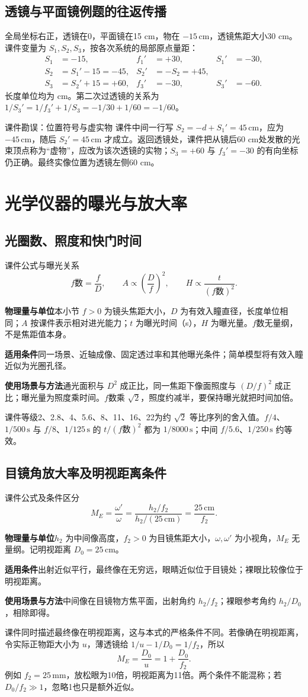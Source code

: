 \documentclass[UTF8,fontset=none,zihao=-4,a4paper]{ctexart}
\newcommand{\chapterpage}[1]{\clearpage\section{#1}}
\newcommand{\unit}[1]{\,\mathrm{#1}}
\newcommand{\explain}[3]{\par\noindent\textbf{物理量与单位}\quad #1\par
\noindent\textbf{适用条件}\quad #2\par
\noindent\textbf{使用场景与方法}\quad #3\par}
\begin{document}
\subsection{透镜与平面镜例题的往返传播}
全局坐标右正，透镜在0，平面镜在15 cm，物在 $-15\unit{cm}$，透镜焦距大小30 cm。课件变量为 $S_1,S_2,S_3$，按各次系统的局部原点量距：
\begin{align*}
 S_1&=-15, & f_1'&=+30, & S_1'&=-30,\\
 S_2&=S_1'-15=-45, & S_2'&=-S_2=+45,\\
 S_3&=S_2'+15=+60, & f_3'&=-30, & S_3'&=-60.
\end{align*}
长度单位均为 cm。第二次过透镜的关系为 $1/S_3'=1/f_3'+1/S_3=-1/30+1/60=-1/60$。

\begin{infobox}[breakable=false]{课件勘误：位置符号与虚实物}
课件中间一行写 $S_2=-d+S_1'=45\unit{cm}$，应为 $-45\unit{cm}$，随后 $S_2'=45\unit{cm}$ 才成立。返回透镜处，课件把从镜后60 cm处发散的光束顶点称为“虚物”，应改为该次透镜的实物；$S_3=+60$ 与 $f_3'=-30$ 的有向坐标仍正确。最终实像位置为透镜左侧60 cm。
\end{infobox}

\chapterpage{光学仪器的曝光与放大率}
\subsection{光圈数、照度和快门时间}
\begin{infobox}[breakable=false]{课件公式与曝光关系}
\[
 f\text{数}=\frac fD,\qquad A\propto\left(\frac Df\right)^2,
 \qquad H\propto\frac{t}{(f\text{数})^2}.
\]
\end{infobox}
\explain{本小节 $f>0$ 为镜头焦距大小，$D$ 为有效入瞳直径，长度单位相同；$A$ 按课件表示相对进光能力；$t$ 为曝光时间（s），$H$ 为曝光量。$f$数无量纲，不是焦距值本身。}{同一场景、近轴成像、固定透过率和其他曝光条件；简单模型将有效入瞳近似为光圈孔径。}{通光面积与 $D^2$ 成正比，同一焦距下像面照度与 $(D/f)^2$ 成正比；曝光量为照度乘时间。$f$数乘 $\sqrt2$，照度约减半，要保持曝光就把时间加倍。}
课件等级2、2.8、4、5.6、8、11、16、22为约 $\sqrt2$ 等比序列的舍入值。$f/4$、$1/500\unit s$ 与 $f/8$、$1/125\unit s$ 的 $t/(f\text{数})^2$ 都为 $1/8000\unit s$；中间 $f/5.6$、$1/250\unit s$ 约等效。

\subsection{目镜角放大率及明视距离条件}
\begin{infobox}[breakable=false]{课件公式及条件区分}
\[
 M_E=\frac{\omega'}\omega
 =\frac{h_2/f_2}{h_2/(25\unit{cm})}=\frac{25\unit{cm}}{f_2}.
\]
\end{infobox}
\explain{$h_2$ 为中间像高度，$f_2>0$ 为目镜焦距大小，$\omega,\omega'$ 为小视角，$M_E$ 无量纲。记明视距离 $D_0=25\unit{cm}$。}{出射近似平行，最终像在无穷远，眼睛近似位于目镜处；裸眼比较像位于明视距离。}{中间像在目镜物方焦平面，出射角约 $h_2/f_2$；裸眼参考角约 $h_2/D_0$，相除即得。}
课件同时描述最终像在明视距离，这与本式的严格条件不同。若像确在明视距离，令实际正物距大小为 $u$，薄透镜给 $1/u-1/D_0=1/f_2$，所以
\[
 M_E=\frac{D_0}u=1+\frac{D_0}{f_2}.
\]
例如 $f_2=25\unit{mm}$，放松眼为10倍，明视距离为11倍。两个条件不能混称；若 $D_0/f_2\gg1$，忽略1也只是额外近似。
\end{document}
